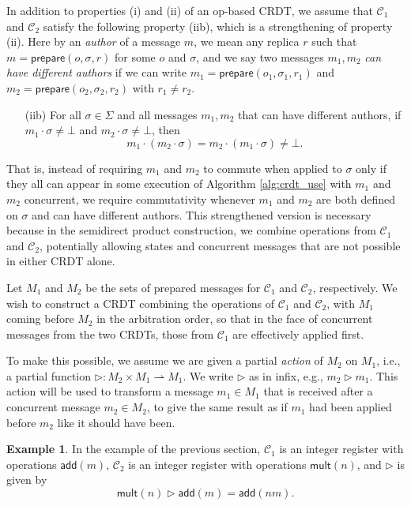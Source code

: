 \documentclass[acmsmall,nonacm,12pt]{acmart}
\newcommand{\mc}[1]{\ensuremath{\mathcal{#1}}}
\newcommand{\msf}[1]{\ensuremath{\mathsf{#1}}}
\newcommand{\pra}{\rightharpoonup}
\newcommand{\act}{\triangleright}
\theoremstyle{plain}
\theoremstyle{definition}
\newtheorem{myex}[mythm]{Example}
\begin{document}
In addition to properties (i) and (ii) of an op-based CRDT, we assume that $\mc{C}_1$ and $\mc{C}_2$ satisfy the following property (iib), which is a strengthening of property (ii).  Here by an \textit{author} of a message $m$, we mean any replica $r$ such that $m = \msf{prepare}(o, \sigma, r)$ for some $o$ and $\sigma$, and we say two messages $m_1, m_2$ \textit{can have different authors} if we can write $m_1 = \msf{prepare}(o_1, \sigma_1, r_1)$ and $m_2 = \msf{prepare}(o_2, \sigma_2, r_2)$ with $r_1 \neq r_2$.
\begin{itemize}
    \item[(iib)] For all $\sigma \in \Sigma$ and all messages $m_1, m_2$ that can have different authors, if $m_1 \cdot \sigma \neq \bot$ and $m_2 \cdot \sigma \neq \bot$, then
    \[
    m_1 \cdot (m_2 \cdot \sigma) = m_2 \cdot (m_1 \cdot \sigma) \neq \bot.
    \]
\end{itemize}
That is, instead of requiring $m_1$ and $m_2$ to commute when applied to $\sigma$ only if they all can appear in some execution of Algorithm \ref{alg:crdt_use} with $m_1$ and $m_2$ concurrent, we require commutativity whenever $m_1$ and $m_2$ are both defined on $\sigma$ and can have different authors.  This strengthened version is necessary because in the semidirect product construction, we combine operations from $\mc{C}_1$ and $\mc{C}_2$, potentially allowing states and concurrent messages that are not possible in either CRDT alone.

Let $M_1$ and $M_2$ be the sets of prepared messages for $\mc{C}_1$ and $\mc{C}_2$, respectively.  We wish to construct a CRDT combining the operations of $\mc{C}_1$ and $\mc{C}_2$, with $M_1$ coming before $M_2$ in the arbitration order, so that in the face of concurrent messages from the two CRDTs, those from $\mc{C}_1$ are effectively applied first.

To make this possible, we assume we are given a partial \textit{action} of $M_2$ on $M_1$, i.e., a partial function $\act: M_2 \times M_1 \pra M_1$.  We write $\act$ as in infix, e.g., $m_2 \act m_1$.  This action will be used to transform a message $m_1 \in M_1$ that is received after a concurrent message $m_2 \in M_2$, to give the same result as if $m_1$ had been applied before $m_2$ like it should have been.

\begin{myex}
In the example of the previous section, $\mc{C}_1$ is an integer register with operations $\msf{add}(m)$, $\mc{C}_2$ is an integer register with operations $\msf{mult}(n)$, and $\act$ is given by
\[
\msf{mult}(n) \act \msf{add}(m) = \msf{add}(nm).
\]
\end{myex}
\end{document}
